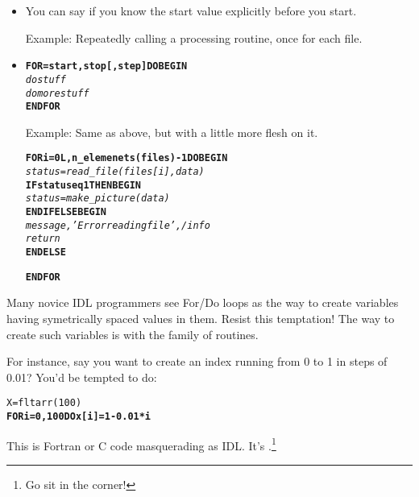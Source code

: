     \begin{itemize} \item {}


	You can say  if you know the start
        value explicitly before you start.

        Example: Repeatedly calling a processing routine, once for
        each file.


     \item {}


\begin{alltt}

\textbf{FOR =start,stop [,step] DO BEGIN}
  \textit{do stuff}
  \textit{do more stuff}
\textbf{ENDFOR}

\end{alltt}

       Example: Same as above, but with a little more flesh on it.

\begin{alltt}

\textbf{FOR i=0L,n_elemenets(files)-1 DO BEGIN}
  \textit{status = read_file(files[i],data)}
  \textbf{IF status eq 1 THEN BEGIN}
    \textit{status = make_picture(data)}
  \textbf{ENDIF ELSE BEGIN}
    \textit{message,'Error reading file',/info}
    \textit{return}
  \textbf{ENDELSE}


\textbf{ENDFOR}
\end{alltt}

    \end{itemize}


   Many novice IDL programmers see For/Do loops as the way to create
  variables having symetrically spaced values in them. Resist this
  temptation! The way to create such variables is with the
   family of routines. 


  For instance, say you want to create an index running from 0 to 1 in
    steps of 0.01? You'd be tempted to do:


\begin{alltt}
  X = fltarr(100)
  \textbf{FOR i=0,100 DO x[i] = 1-0.01*i}
\end{alltt}

    This is Fortran or C code masquerading as IDL. It's .\footnote{Go sit in the corner!}


